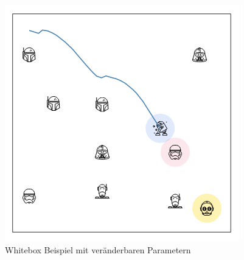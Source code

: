 \begin{figure}[ht!]
  \centering
  \includegraphics[width=0.7\linewidth, height=0.7\linewidth]{img/sim2.png}
  \caption{Whitebox Beispiel mit veränderbaren Parametern}
  \label{fig:whitebox}
\end{figure}


